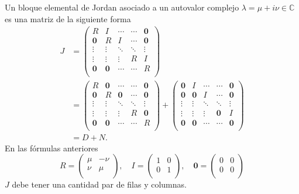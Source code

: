 Un bloque elemental  de Jordan asociado a un autovalor complejo $\lambda=\mu+i\nu\in\mathbb{C}$ es una matriz  de la siguiente forma
\[
\begin{split}
 J&=
   \begin{pmatrix}
    R & I        & \cdots& \cdots  &\boldsymbol{0}\\
    \boldsymbol{0}         &R  &  I      &\cdots &\boldsymbol{0} \\
    \vdots    & \vdots   &\ddots  &\ddots&\vdots \\
     \vdots    & \vdots  & \vdots   &R  &I\\
      \boldsymbol{0}    & \boldsymbol{0}   & \cdots& \cdots &R\\   
   \end{pmatrix}\\
   &=
      \begin{pmatrix}
    R & \boldsymbol{0}        & \cdots& \cdots  &\boldsymbol{0}\\
    \boldsymbol{0}         &R  &  \boldsymbol{0}      &\cdots &\boldsymbol{0} \\
    \vdots    & \vdots   &\ddots  &\ddots&\vdots \\
     \vdots    & \vdots  & \vdots   &R  &\boldsymbol{0}\\
      \boldsymbol{0}    & \boldsymbol{0}   & \cdots& \cdots &R\\   
   \end{pmatrix}
  +
      \begin{pmatrix}
    \boldsymbol{0} & I        & \cdots& \cdots  &\boldsymbol{0}\\
    \boldsymbol{0}         &\boldsymbol{0}  &  I      &\cdots &\boldsymbol{0} \\
    \vdots    & \vdots   &\ddots  &\ddots&\vdots \\
     \vdots    & \vdots  & \vdots   &\boldsymbol{0}  &I\\
      \boldsymbol{0}    & \boldsymbol{0}   & \cdots& \cdots &\boldsymbol{0}\\   
   \end{pmatrix}\\
   &=D+N.
\end{split}
\]
En las fórmulas anteriores
\[
 R=\begin{pmatrix}
    \mu & -\nu\\
    \nu & \mu\\
   \end{pmatrix}
,\quad 
  I=\begin{pmatrix}
    1 & 0\\
    0 & 1\\
   \end{pmatrix}
  ,\quad 
   \boldsymbol{0}=\begin{pmatrix}
    0 & 0\\
    0 & 0\\
   \end{pmatrix}
\]
$J$ debe tener una cantidad par de filas y columnas.

